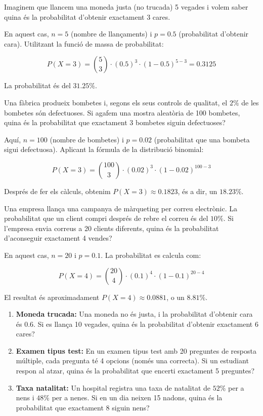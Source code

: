 \documentclass[12pt]{article}
\begin{document}
\begin{exemple} \noindent 
Imaginem que llancem una moneda justa (no trucada) 5 vegades i volem saber quina és la probabilitat d'obtenir exactament 3 cares.

En aquest cas, $n=5$ (nombre de llançaments) i $p=0.5$ (probabilitat d'obtenir cara). Utilitzant la funció de massa de probabilitat:

\[
P(X=3) = \binom{5}{3} \cdot (0.5)^3 \cdot (1-0.5)^{5-3} = 0.3125
\]

La probabilitat és del $31.25\%$.
\end{exemple}

\begin{exemple} \noindent 
Una fàbrica produeix bombetes i, segons els seus controls de qualitat, el $2\%$ de les bombetes són defectuoses. Si agafem una mostra aleatòria de 100 bombetes, quina és la probabilitat que exactament 3 bombetes siguin defectuoses?

Aquí, $n=100$ (nombre de bombetes) i $p=0.02$ (probabilitat que una bombeta sigui defectuosa). Aplicant la fórmula de la distribució binomial:

\[
P(X=3) = \binom{100}{3} \cdot (0.02)^3 \cdot (1-0.02)^{100-3}
\]

Després de fer els càlculs, obtenim $P(X=3) \approx 0.1823$, és a dir, un $18.23\%$.
\end{exemple}

\begin{exemple} \noindent 
Una empresa llança una campanya de màrqueting per correu electrònic. La probabilitat que un client compri després de rebre el correu és del $10\%$. Si l'empresa envia correus a 20 clients diferents, quina és la probabilitat d'aconseguir exactament 4 vendes?

En aquest cas, $n=20$ i $p=0.1$. La probabilitat es calcula com:

\[
P(X=4) = \binom{20}{4} \cdot (0.1)^4 \cdot (1-0.1)^{20-4}
\]

El resultat és aproximadament $P(X=4) \approx 0.0881$, o un $8.81\%$.
\end{exemple}

\begin{exercici}[title=Exercicis proposats] \noindent 
\begin{enumerate}
    \item \textbf{Moneda trucada:} Una moneda no és justa, i la probabilitat d'obtenir cara és $0.6$. Si es llança 10 vegades, quina és la probabilitat d'obtenir exactament 6 cares?
    \item \textbf{Examen tipus test:} En un examen tipus test amb 20 preguntes de resposta múltiple, cada pregunta té 4 opcions (només una correcta). Si un estudiant respon al atzar, quina és la probabilitat que encerti exactament 5 preguntes?
    \item \textbf{Taxa natalitat:} Un hospital registra una taxa de natalitat de $52\%$ per a nens i $48\%$ per a nenes. Si en un dia neixen 15 nadons, quina és la probabilitat que exactament 8 siguin nens?
\end{enumerate}
\end{exercici}
\end{document}
